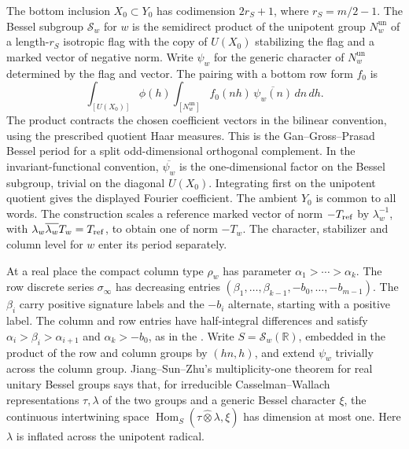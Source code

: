 The bottom inclusion \(X_0\subset Y_0\) has codimension \(2r_S+1\),
where \(r_S=m/2-1\). The Bessel subgroup \(\mathcal S_w\) for \(w\) is
the semidirect product of the unipotent group \(N_w^{\mathrm{un}}\) of a
length-\(r_S\) isotropic flag with the copy of \(U(X_0)\) stabilizing the
flag and a marked vector of negative norm. Write \(\psi_w\) for the
generic character of \(N_w^{\mathrm{un}}\) determined by the flag and
vector. The pairing with a bottom row form \(f_0\) is
\[
 \int_{[U(X_0)]}\phi(h)
    \int_{[N_w^{\mathrm{un}}]} f_0(nh)\,\overline{\psi_w(n)}\,dn\,dh .
\]
The product contracts the chosen coefficient vectors in the bilinear
convention, using the prescribed quotient Haar measures. This is the
Gan--Gross--Prasad Bessel period for a split odd-dimensional
orthogonal complement. In the invariant-functional convention,
\(\overline{\psi_w}\) is the one-dimensional factor on the Bessel
subgroup, trivial on the diagonal \(U(X_0)\). Integrating first on
the unipotent quotient gives the displayed Fourier coefficient.
\cite[\S\S12, 23]{ggp}
The ambient \(Y_0\) is common to all words. The
construction scales a reference marked vector of norm \(-T_{\rm ref}\)
by \(\lambda_w^{-1}\), with \(\lambda_w\overline{\lambda_w}T_w=T_{\rm ref}\),
to obtain one of norm \(-T_w\). The character, stabilizer and column
level for \(w\) enter its period separately.

At a real place the compact column type \(\rho_w\) has parameter
\(\alpha_1>\cdots>\alpha_k\). The row discrete series \(\sigma_\infty\)
has decreasing entries \((\beta_1,\ldots,\beta_{k-1},-b_0,\ldots,-b_{m-1})\).
The \(\beta_i\) carry positive signature labels and the \(-b_i\)
alternate, starting with a positive label. The column and row entries
have half-integral differences and satisfy
\(\alpha_i>\beta_i>\alpha_{i+1}\) and \(\alpha_k>-b_0\), as in the
.
Write \(S=\mathcal S_w(\mathbb R)\), embedded in the product of the row
and column groups by \((hn,h)\), and extend \(\psi_w\) trivially across
the column group. Jiang--Sun--Zhu's multiplicity-one theorem for real
unitary Bessel groups says that, for irreducible Casselman--Wallach
representations \(\tau,\lambda\) of the two groups and a generic Bessel
character \(\xi\), the continuous intertwining space
\(\operatorname{Hom}_S(\tau\widehat\otimes\lambda,\xi)\) has dimension
at most one. Here \(\lambda\) is inflated across the unipotent radical.
\cite[Theorem~A]{p2jiang-sun-zhu}

